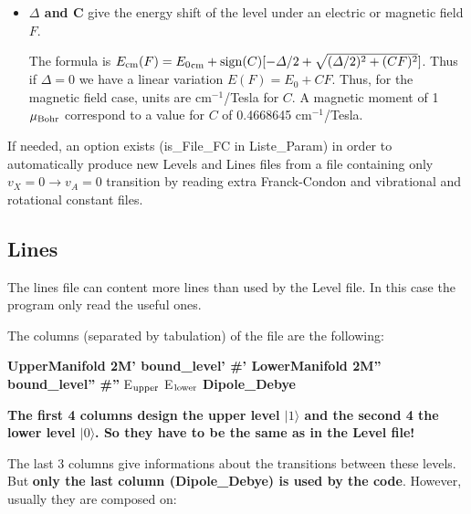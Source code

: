 \documentclass[amsmath,amssymb,nofootinbib]{revtex4-2}
\begin{document}
\begin{itemize}
\item \textbf{$\Delta$ and C} give the energy shift of the level under an electric or magnetic field $F$. 

The formula is $E_{\rm cm}(F)= {E_0}_{\rm cm} + {\rm sign}(C) [-\Delta/2+\sqrt{(\Delta/2)^2+(C F)^2}]$.
Thus if $\Delta = 0$ we have a linear variation $E(F)= E_0 + C F$. 
Thus, for the magnetic field case, units are  cm$^{-1}$/Tesla for $C$. A magnetic moment of 1 $\mu_{\rm Bohr}$ correspond to a value for $C$ of  0.4668645 cm$^{-1}$/Tesla.


\end{itemize}

If needed, an option exists (is\_File\_FC in Liste\_Param) in order to automatically produce new Levels and Lines files from a file containing only $v_X=0 \rightarrow v_A =0$ transition by reading  extra Franck-Condon and vibrational and rotational constant files.



\subsection{Lines}

The lines file can content more lines than used by the Level file. In this case the program only read the useful ones.
	
	The columns (separated by tabulation) of the file are the following:
	

	
	\bigskip
	
 \textbf{UpperManifold	2M'	bound\_level'	\#'	LowerManifold	2M''	bound\_level''	\#''}		E$_{\rm upper}$	E$_{\rm lower}$	 \textbf{Dipole\_Debye}	 
	
\bigskip

 \textbf{The first 4 columns design the upper level $|1\rangle$ and the second 4 the lower level $|0\rangle$.
So they have to be the same as in the Level file!}

  The last 3 columns give informations about the transitions between these levels.
But  \textbf{only the last column (Dipole\_Debye)	  is used by the code}. However, usually they are composed on:
\end{document}
